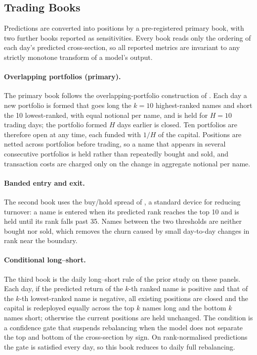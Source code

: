 
\subsection{Trading Books}

Predictions are converted into positions by a pre-registered primary
book, with two further books reported as sensitivities. Every book reads
only the ordering of each day's predicted cross-section, so all reported
metrics are invariant to any strictly monotone transform of a model's
output.

\paragraph{Overlapping portfolios (primary).} The primary book follows
the overlapping-portfolio construction of \citet{efficiency1993returns}.
Each day a new portfolio is formed that goes long the $k=10$ highest-ranked
names and short the 10 lowest-ranked, with equal notional per name, and
is held for $H=10$ trading days; the portfolio formed $H$ days earlier is
closed. Ten portfolios are therefore open at any time, each funded with
$1/H$ of the capital. Positions are netted across portfolios before
trading, so a name that appears in several consecutive portfolios is
held rather than repeatedly bought and sold, and transaction costs are
charged only on the change in aggregate notional per name.

\paragraph{Banded entry and exit.} The second book uses the buy/hold
spread of \citet{novy2016taxonomy}, a standard device for reducing
turnover: a name is entered when its predicted rank reaches the top 10
and is held until its rank falls past 35. Names between the two
thresholds are neither bought nor sold, which removes the churn caused
by small day-to-day changes in rank near the boundary.

\paragraph{Conditional long--short.} The third book is the daily
long--short rule of the prior study on these panels. Each day, if the
predicted return of the $k$-th ranked name is positive and that of the
$k$-th lowest-ranked name is negative, all existing positions are
closed and the capital is redeployed equally across the top $k$ names
long and the bottom $k$ names short; otherwise the current positions are
held unchanged. The condition is a confidence gate that suspends
rebalancing when the model does not separate the top and bottom of the
cross-section by sign. On rank-normalised predictions the gate is
satisfied every day, so this book reduces to daily full rebalancing.

